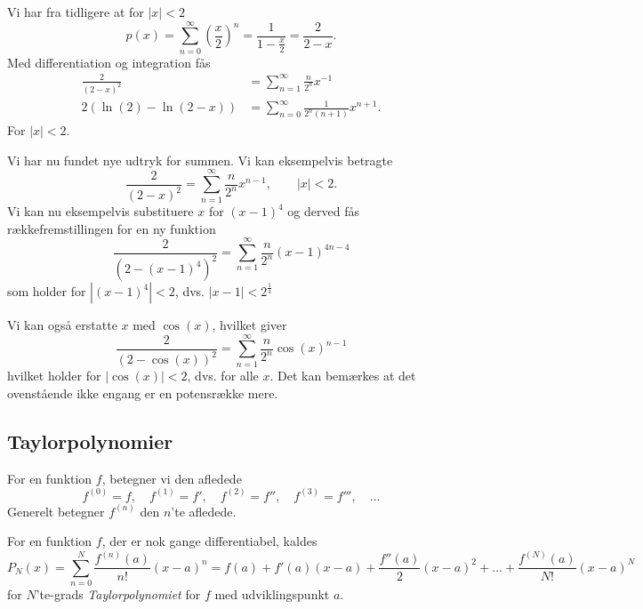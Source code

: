 \begin{eks} 
  Vi har fra tidligere at for $|x|<2$
  \[ 
  p(x) = \sum_{n = 0}^{\infty} \left( \frac{x}{2} \right)^{n} = \frac{1}{1 - \frac{x}{2}} = \frac{2}{2-x}
  .\]
  Med differentiation og integration fås
  \begin{align*}
    \frac{2}{(2-x)^2} &= \sum_{n = 1}^{\infty} \frac{n}{2^n} x^{-1} \\
    2(\ln(2)-\ln(2-x)) &= \sum_{n = 0}^{\infty} \frac{1}{2^{n}(n+1)}x^{n+1}
  .\end{align*}
  For $|x|<2$.

  Vi har nu fundet nye udtryk for summen. Vi kan eksempelvis betragte
  \[ 
  \frac{2}{(2-x)^2} = \sum_{n = 1}^{\infty} \frac{n}{2^n}x^{n-1}, \qquad |x| < 2
  .\]
  Vi kan nu eksempelvis substituere $x$ for $(x-1)^{4}$ og derved fås rækkefremstillingen for en ny funktion
  \[ 
  \frac{2}{(2-(x-1)^{4})^{2}} = \sum_{n = 1}^{\infty} \frac{n}{2^{n}} (x-1)^{4n-4}
  \]
  som holder for $|(x-1)^{4}| < 2$, dvs. $|x-1| < 2^{\frac{1}{4}}$

  Vi kan også erstatte $x$ med $\cos(x)$, hvilket giver
  \[ 
  \frac{2}{(2-\cos(x))^{2}} = \sum_{n = 1}^{\infty} \frac{n}{2^{n}} \cos(x)^{n-1}
  \]
  hvilket holder for $|\cos(x)| < 2$, dvs. for alle $x$. Det kan bemærkes at det ovenstående ikke engang er en potensrække mere.
\end{eks}


\subsection{Taylorpolynomier}
\begin{definition} [Afledningsnotation]
  For en funktion $f$, betegner vi den afledede
  \[ 
  f^{(0)} = f, \quad f^{(1)} = f', \quad f^{(2)} = f'', \quad f^{(3)} = f''', \quad \ldots
  \]
  Generelt betegner $f^{(n)}$ den $n$'te afledede.
\end{definition}

\begin{definition} [Taylorpolynomier]
  For en funktion $f$, der er nok gange differentiabel, kaldes
  \[ 
  P_N(x) = \sum_{n = 0}^{N} \frac{f^{(n)}(a)}{n!}(x-a)^{n} = f(a) + f'(a)(x-a) + \frac{f''(a)}{2}(x-a)^2 + \ldots + \frac{f^{(N)}(a)}{N!}(x-a)^{N}
  \]
  for $N$'te-grads \textit{Taylorpolynomiet} for $f$ med udviklingspunkt $a$.
\end{definition}


